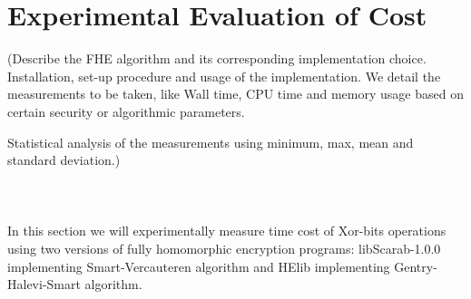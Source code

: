 \documentclass{acm_proc_article-sp}
\begin{document}
\section{Experimental Evaluation of Cost}

(Describe the FHE algorithm and its corresponding implementation choice. Installation, set-up procedure and usage of the implementation. We detail the measurements to be taken, like Wall time, CPU time and memory usage based on certain security or algorithmic parameters.

Statistical analysis of the measurements using minimum, max, mean and standard deviation.) \\\\\\\\

In this section we will experimentally measure time cost of Xor-bits operations using two versions of fully homomorphic encryption programs: libScarab-1.0.0 implementing Smart-Vercauteren algorithm and HElib implementing Gentry-Halevi-Smart algorithm.
\end{document}
